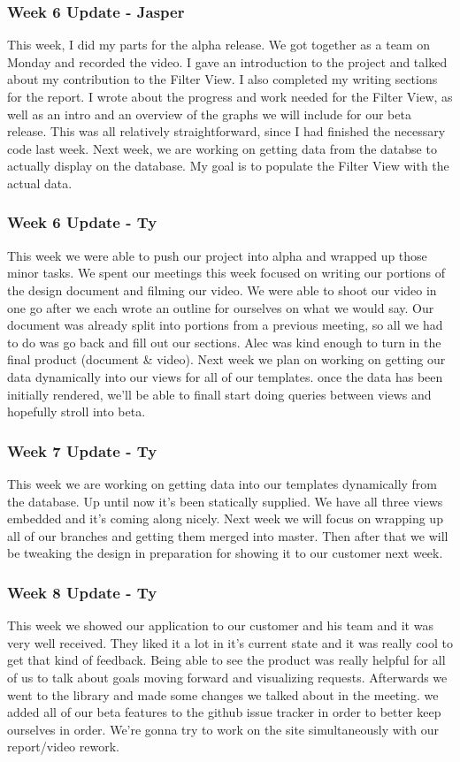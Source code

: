 \subsubsection{Week 6 Update - Jasper}
This week, I did my parts for the alpha release.
We got together as a team on Monday and recorded the video.
I gave an introduction to the project and talked about my contribution to the Filter View.
I also completed my writing sections for the report.
I wrote about the progress and work needed for the Filter View, as well as an intro and an overview of the graphs we will include for our beta release.
This was all relatively straightforward, since I had finished the necessary code last week.
Next week, we are working on getting data from the databse to actually display on the database.
My goal is to populate the Filter View with the actual data.

\subsubsection{Week 6 Update - Ty}
This week we were able to push our project into alpha and wrapped up those minor tasks.
We spent our meetings this week focused on writing our portions of the design document and filming our video.
We were able to shoot our video in one go after we each wrote an outline for ourselves on what we would say.
Our document was already split into portions from a previous meeting, so all we had to do was go back and fill out our sections.
Alec was kind enough to turn in the final product (document & video).
Next week we plan on working on getting our data dynamically into our views for all of our templates.
once the data has been initially rendered, we'll be able to finall start doing queries between views and hopefully stroll into beta. ​

\subsubsection{Week 7 Update - Ty}
This week we are working on getting data into our templates dynamically from the database.
Up until now it's been statically supplied.
We have all three views embedded and it's coming along nicely.
Next week we will focus on wrapping up all of our branches and getting them merged into master.
Then after that we will be tweaking the design in preparation for showing it to our customer next week.​

\subsubsection{Week 8 Update - Ty}
This week we showed our application to our customer and his team and it was very well received.
They liked it a lot in it's current state and it was really cool to get that kind of feedback.
Being able to see the product was really helpful for all of us to talk about goals moving forward and visualizing requests.
​Afterwards we went to the library and made some changes we talked about in the meeting.
we added all of our beta features to the github issue tracker in order to better keep ourselves in order.
We're gonna try to work on the site simultaneously with our report/video rework.

